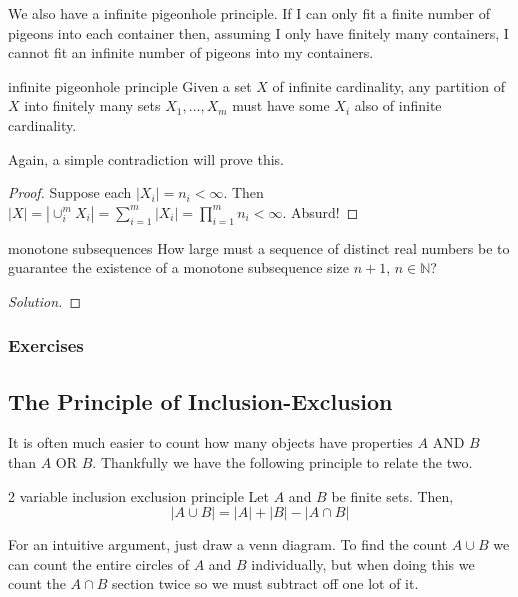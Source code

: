 \documentclass{article}
\begin{document}
We also have a infinite pigeonhole principle. If I can only fit a finite number of pigeons into each container then, assuming I only have 
finitely many containers, I cannot fit an infinite number of pigeons into my containers.

\begin{theorem}[]{infinite pigeonhole principle}
    Given a set $X$ of infinite cardinality, any partition of $X$ into finitely many sets $X_1, \dots, X_m$ must have some $X_i$ also of infinite 
    cardinality. 
\end{theorem}

Again, a simple contradiction will prove this.

\begin{proof}
    Suppose each $|X_i| = n_i < \infty$. Then $|X| = |\cup_{i}^m X_i| = \sum_{i=1}^m |X_i| 
    = \prod_{i=1}^m n_i < \infty$. Absurd!
\end{proof}

\begin{problem}[]{monotone subsequences}
    How large must a sequence of distinct real numbers be to guarantee the existence of a monotone subsequence 
    size $n + 1$, $n \in \mathbb{N}$? 
\end{problem}

\begin{proof}[Solution]

\end{proof}

\subsubsection*{Exercises}

\newpage

\subsection{The Principle of Inclusion-Exclusion}

It is often much easier to count how many objects have properties $A$ AND $B$ than $A$ OR $B$. Thankfully we have the following principle to 
relate the two.

\begin{proposition}[]{2 variable inclusion exclusion principle}
    Let $A$ and $B$ be finite sets. Then, 
    \[|A \cup B| = |A| + |B| - |A \cap B|\]    
\end{proposition}

For an intuitive argument, just draw a venn diagram. To find the count $A \cup B$ we can count the entire circles
of $A$ and $B$ individually, but when doing this we count the $A \cap B$ section twice so we must subtract off one 
lot of it. \\
\end{document}
